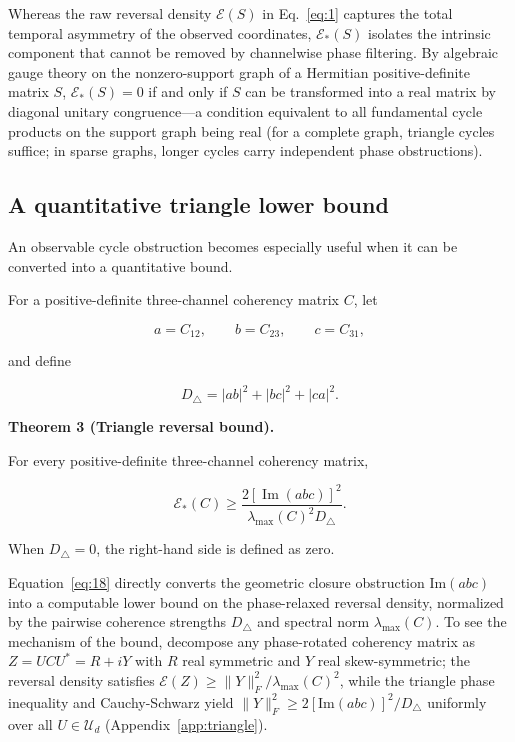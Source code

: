 \documentclass[aps,pre,reprint,amsmath,amssymb,superscriptaddress]{revtex4-2}
\begin{document}
Whereas the raw reversal density $\mathcal{E}(S)$ in Eq.~\eqref{eq:1} captures the total temporal asymmetry of the observed coordinates, $\mathcal{E}_*(S)$ isolates the intrinsic component that cannot be removed by channelwise phase filtering. By algebraic gauge theory on the nonzero-support graph of a Hermitian positive-definite matrix $S$, $\mathcal{E}_*(S) = 0$ if and only if $S$ can be transformed into a real matrix by diagonal unitary congruence---a condition equivalent to all fundamental cycle products on the support graph being real (for a complete graph, triangle cycles suffice; in sparse graphs, longer cycles carry independent phase obstructions).

\subsection{A quantitative triangle lower bound}

An observable cycle obstruction becomes especially useful when it can be converted into a quantitative bound.

For a positive-definite three-channel coherency matrix \(C\), let

\[
a=C_{12},\qquad
b=C_{23},\qquad
c=C_{31},
\]

and define

\[
D_\triangle
=
|ab|^2+|bc|^2+|ca|^2.
\]

\textbf{Theorem 3 (Triangle reversal bound).}

For every positive-definite three-channel coherency matrix,

\begin{equation}\label{eq:18}
\boxed{
\mathcal E_*(C)
\ge
\frac{
2[\operatorname{Im}(abc)]^2
}{
\lambda_{\max}(C)^2D_\triangle
}.
}
\end{equation}

When \(D_\triangle=0\), the right-hand side is defined as zero.

Equation~\eqref{eq:18} directly converts the geometric closure obstruction $\mathrm{Im}(abc)$ into a computable lower bound on the phase-relaxed reversal density, normalized by the pairwise coherence strengths $D_\triangle$ and spectral norm $\lambda_{\max}(C)$. To see the mechanism of the bound, decompose any phase-rotated coherency matrix as $Z = U C U^* = R + iY$ with $R$ real symmetric and $Y$ real skew-symmetric; the reversal density satisfies $\mathcal{E}(Z) \ge \|Y\|_F^2 / \lambda_{\max}(C)^2$, while the triangle phase inequality and Cauchy-Schwarz yield $\|Y\|_F^2 \ge 2[\mathrm{Im}(abc)]^2 / D_\triangle$ uniformly over all $U \in \mathcal{U}_d$ (Appendix~\ref{app:triangle}).
\end{document}
